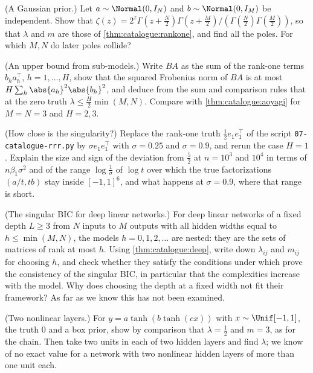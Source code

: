 \begin{refsection}
\begin{exercises}
\item \variation (A Gaussian prior.)\label{ex:catalogue:gaussian} Let $a\sim\Normal(0,I_N)$ and $b\sim\Normal(0,I_M)$ be independent. Show that $\zeta(z)=2^z\Gamma(z+\frac N2)\Gamma(z+\frac M2)/(\Gamma(\frac N2)\Gamma(\frac M2))$, so that $\lambda$ and $m$ are those of \cref{thm:catalogue:rankone}, and find all the poles. For which $M,N$ do later poles collide?

\item \variation (An upper bound from sub-models.)\label{ex:catalogue:submodel} Write $BA$ as the sum of the rank-one terms $b_ha_h^\top$, $h=1,\dots,H$, show that the squared Frobenius norm of $BA$ is at most $H\sum_h\abs{a_h}^2\abs{b_h}^2$, and deduce from the sum and comparison rules that at the zero truth $\lambda\le\frac H2\min(M,N)$. Compare with \cref{thm:catalogue:aoyagi} for $M=N=3$ and $H=2,3$.

\item \measurement (How close is the singularity?)\label{ex:catalogue:closeness} Replace the rank-one truth $\frac12e_1e_1^\top$ of the script \texttt{07-catalogue-rrr.py} by $\sigma e_1e_1^\top$ with $\sigma=0.25$ and $\sigma=0.9$, and rerun the case $H=1$. Explain the size and sign of the deviation from $\frac52$ at $n=10^3$ and $10^4$ in terms of $n\beta_1\sigma^2$ and of the range $\log\frac1\sigma$ of $\log t$ over which the true factorizations $(a/t,tb)$ stay inside $[-1,1]^6$, and what happens at $\sigma=0.9$, where that range is short.

\item \research (The singular BIC for deep linear networks.)\label{ex:catalogue:sbicdeep} For deep linear networks of a fixed depth $L\ge3$ from $N$ inputs to $M$ outputs with all hidden widths equal to $h\le\min(M,N)$, the models $h=0,1,2,\dots$ are nested: they are the sets of matrices of rank at most $h$. Using \cref{thm:catalogue:deep}, write down $\lambda_{ij}$ and $m_{ij}$ for choosing $h$, and check whether they satisfy the conditions under which \textcite{DrtonPlummer2017} prove the consistency of the singular BIC, in particular that the complexities increase with the model. Why does choosing the depth at a fixed width not fit their framework? As far as we know this has not been examined.

\item \research (Two nonlinear layers.)\label{ex:catalogue:twolayers} For $y=a\tanh(b\tanh(cx))$ with $x\sim\Unif[-1,1]$, the truth $0$ and a box prior, show by comparison that $\lambda=\frac12$ and $m=3$, as for the chain. Then take two units in each of two hidden layers and find $\lambda$; we know of no exact value for a network with two nonlinear hidden layers of more than one unit each.
\end{exercises}


\end{refsection}
